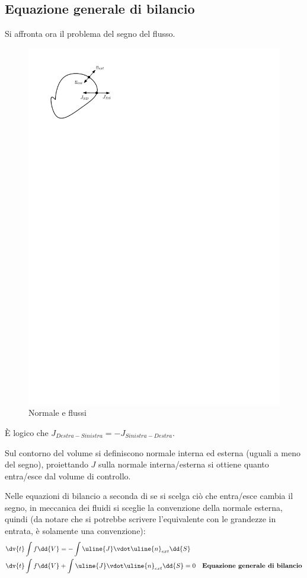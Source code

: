 \subsection{Equazione generale di bilancio}
Si affronta ora il problema del segno del flusso.
%
	\begin{figure}[ht]
		\includegraphics[scale=0.8]{./1.4 Equazioni di bilancio/1.4-5}
		\centering
		\caption{Normale e flussi}
	\end{figure}
%
È logico che $J_{Destra-Sinistra} = - J_{Sinistra-Destra} $.

Sul contorno del volume si definiscono normale interna ed esterna (uguali a meno del segno), proiettando $J$ sulla normale interna/esterna si ottiene quanto entra/esce dal volume di controllo.

Nelle equazioni di bilancio a seconda di se si scelga ciò che entra/esce cambia il segno, in meccanica dei fluidi si sceglie la convenzione della normale esterna, quindi (da notare che si potrebbe scrivere l'equivalente con le grandezze in entrata, è solamente una convenzione):
%
	\begin{equation*}
		\begin{aligned}
			&\dv{t} \int {f \dd{V}} = - \int{\uline{J} \vdot \uline{n}_{ext} \dd{S}} \\
			&\dv{t} \int {f \dd{V}} + \int{\uline{J} \vdot \uline{n}_{ext} \dd{S}} = 0 \quad \textbf{Equazione generale di bilancio}
		\end{aligned}
	\end{equation*}
%

